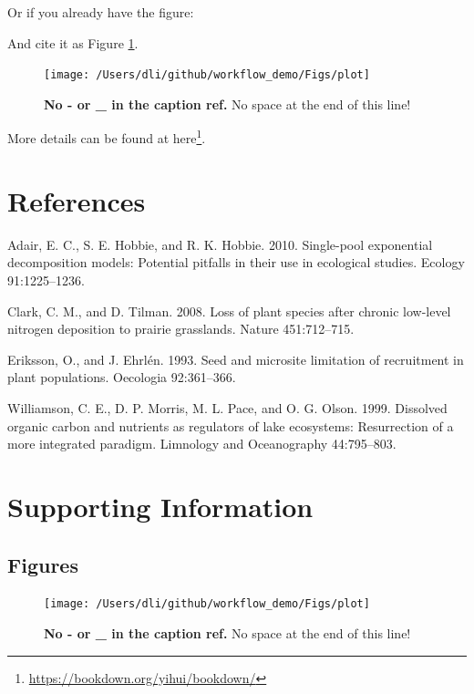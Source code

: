 \documentclass[
  12pt,
]{article}
\DeclareRobustCommand{\href}[2]{#2\footnote{\url{#1}}}
\newlength{\cslhangindent}
\newenvironment{cslreferences}%
  {\setlength{\parindent}{0pt}%
  \everypar{\setlength{\hangindent}{\cslhangindent}}\ignorespaces}%
  {\par}
\begin{document}
Or if you already have the figure:

And cite it as Figure \ref{fig:fig2}.



\begin{figure}[H]

{\centering \texttt{[image: /Users/dli/github/workflow\_demo/Figs/plot]} 

}

\caption{\textbf{No - or \_ in the caption ref.} No space at the end of this line!}\label{fig:fig2}
\end{figure}

More details can be found at \href{https://bookdown.org/yihui/bookdown/}{here}.

\hypertarget{references}{%
\section{References}\label{references}}

\hypertarget{refs}{}
\begin{cslreferences}
\leavevmode\hypertarget{ref-adair_single-pool_2010}{}%
Adair, E. C., S. E. Hobbie, and R. K. Hobbie. 2010. Single-pool exponential decomposition models: Potential pitfalls in their use in ecological studies. Ecology 91:1225--1236.

\leavevmode\hypertarget{ref-clark_loss_2008}{}%
Clark, C. M., and D. Tilman. 2008. Loss of plant species after chronic low-level nitrogen deposition to prairie grasslands. Nature 451:712--715.

\leavevmode\hypertarget{ref-eriksson_seed_1993}{}%
Eriksson, O., and J. Ehrlén. 1993. Seed and microsite limitation of recruitment in plant populations. Oecologia 92:361--366.

\leavevmode\hypertarget{ref-williamson_dissolved_1999}{}%
Williamson, C. E., D. P. Morris, M. L. Pace, and O. G. Olson. 1999. Dissolved organic carbon and nutrients as regulators of lake ecosystems: Resurrection of a more integrated paradigm. Limnology and Oceanography 44:795--803.
\end{cslreferences}

\clearpage

\setcounter{page}{0}
\setcounter{page}{1}

\setcounter{figure}{0}
\setcounter{table}{0}
\renewcommand {\thetable}{S\arabic{table}}
\renewcommand {\thefigure}{S\arabic{figure}}

\hypertarget{supporting-information}{%
\section{Supporting Information}\label{supporting-information}}

\hypertarget{figures-1}{%
\subsection{Figures}\label{figures-1}}



\begin{figure}[H]

{\centering \texttt{[image: /Users/dli/github/workflow\_demo/Figs/plot]} 

}

\caption{\textbf{No - or \_ in the caption ref.} No space at the end of this line!}\label{fig:figS1}
\end{figure}
\end{document}
